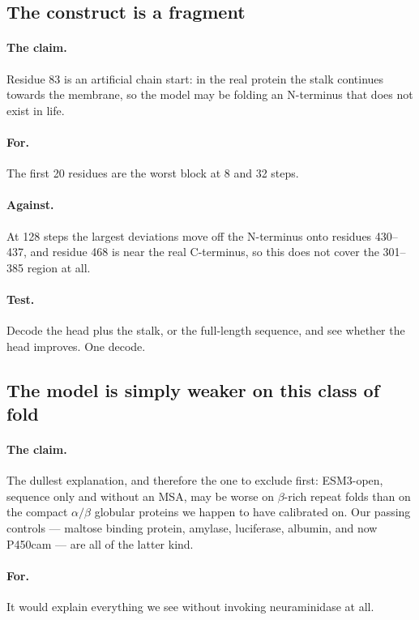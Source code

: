 \documentclass[11pt,a4paper]{article}
\begin{document}
\subsection{The construct is a fragment}

\paragraph{The claim.} Residue 83 is an artificial chain start: in the real
protein the stalk continues towards the membrane, so the model may be folding an
N-terminus that does not exist in life.

\paragraph{For.} The first 20 residues are the worst block at 8 and 32 steps.

\paragraph{Against.} At 128 steps the largest deviations move off the N-terminus
onto residues 430--437, and residue 468 is near the real C-terminus, so this does
not cover the 301--385 region at all.

\paragraph{Test.} Decode the head plus the stalk, or the full-length sequence,
and see whether the head improves. One decode.

\subsection{The model is simply weaker on this class of fold}\label{sec:boring}

\paragraph{The claim.} The dullest explanation, and therefore the one to exclude
first: ESM3-open, sequence only and without an MSA, may be worse on $\beta$-rich
repeat folds than on the compact $\alpha/\beta$ globular proteins we happen to
have calibrated on. Our passing controls --- maltose binding protein, amylase,
luciferase, albumin, and now P450cam --- are all of the latter kind.

\paragraph{For.} It would explain everything we see without invoking
neuraminidase at all.
\end{document}
